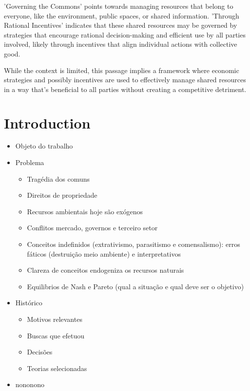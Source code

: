 \documentclass[a4paper,12pt]{article}
\begin{document}
'Governing the Commons' points towards managing resources that belong to everyone, like the environment, public spaces, or shared information. 'Through Rational Incentives' indicates that these shared resources may be governed by strategies that encourage rational decision-making and efficient use by all parties involved, likely through incentives that align individual actions with collective good.

While the context is limited, this passage implies a framework where economic strategies and possibly incentives are used to effectively manage shared resources in a way that's beneficial to all parties without creating a competitive detriment.

\newpage
\section{Introduction}

\begin{itemize}
    \item Objeto do trabalho
    \item Problema
    \begin{itemize}
        \item Tragédia dos comuns
        \item Direitos de propriedade
        \item Recursos ambientais hoje são exógenos
        \item Conflitos mercado, governos e terceiro setor
        \item Conceitos indefinidos (extrativismo, parasitismo e comensalismo): erros fáticos (destruição meio ambiente) e interpretativos
        \item Clareza de conceitos endogeniza os recursos naturais
        \item Equilibrios de Nash e Pareto (qual a situação e qual deve ser o objetivo)
    \end{itemize}
    \item Histórico
    \begin{itemize}
        \item Motivos relevantes
        \item Buscas que efetuou
        \item Decisões
        \item Teorias selecionadas
    \end{itemize}
    \item nononono
\end{itemize}
\end{document}
